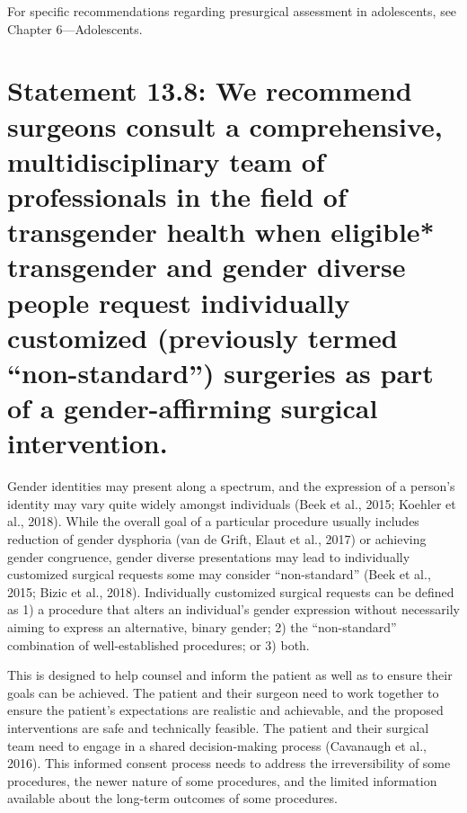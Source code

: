 \documentclass[
]{book}
\begin{document}
For specific recommendations regarding presurgical assessment in adolescents, see Chapter
6---Adolescents.

\hypertarget{statement-13.8-we-recommend-surgeons-consult-a-comprehensive-multidisciplinary-team-of-professionals-in-the-field-of-transgender-health-when-eligible-transgender-and-gender-diverse-people-request-individually-customized-previously-termed-non-standard-surgeries-as-part-of-a-gender-affirming-surgical-intervention.}{%
\section*{Statement 13.8: We recommend surgeons consult a comprehensive, multidisciplinary team of professionals in the field of transgender health when eligible* transgender and gender diverse people request individually customized (previously termed ``non-standard'') surgeries as part of a gender-affirming surgical intervention.}\label{statement-13.8-we-recommend-surgeons-consult-a-comprehensive-multidisciplinary-team-of-professionals-in-the-field-of-transgender-health-when-eligible-transgender-and-gender-diverse-people-request-individually-customized-previously-termed-non-standard-surgeries-as-part-of-a-gender-affirming-surgical-intervention.}}

Gender identities may present along a spectrum, and the expression of a person's identity
may vary quite widely amongst individuals (Beek
et al., 2015; Koehler et al., 2018). While the overall goal of a particular procedure usually includes
reduction of gender dysphoria (van de Grift,
Elaut et al., 2017) or achieving gender congruence, gender diverse presentations may lead to
individually customized surgical requests some
may consider ``non-standard'' (Beek et al., 2015;
Bizic et al., 2018). Individually customized surgical requests can be defined as 1) a procedure
that alters an individual's gender expression without necessarily aiming to express an alternative,
binary gender; 2) the ``non-standard'' combination
of well-established procedures; or 3) both.

This is designed to help counsel and inform
the patient as well as to ensure their goals can
be achieved. The patient and their surgeon need
to work together to ensure the patient's expectations are realistic and achievable, and the proposed interventions are safe and technically
feasible. The patient and their surgical team need
to engage in a shared decision-making process
(Cavanaugh et al., 2016). This informed consent
process needs to address the irreversibility of
some procedures, the newer nature of some procedures, and the limited information available
about the long-term outcomes of some
procedures.
\end{document}
